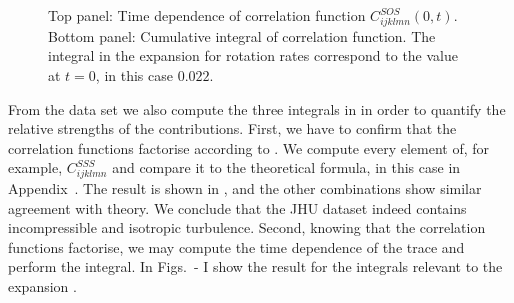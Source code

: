\documentclass[thesis.tex]{subfiles}
\begin{document}
\begin{figure}
	\begin{center}
\end{center}
\caption{ Top panel: Time dependence of correlation function $C^{SOS}_{ijklmn}(0,t)$. Bottom panel: Cumulative integral of correlation function. The integral in the expansion for rotation rates  correspond to the value at $t=0$, in this case $0.022$.}%
\end{figure}

From the data set we also compute the three integrals in  in order to quantify the relative strengths of the contributions. First, we have to confirm that the correlation functions factorise according to . We compute every element of, for example, $C^{SSS}_{ijklmn}$ and compare it to the theoretical formula, in this case  in Appendix~. The result is shown in , and the other combinations show similar agreement with theory. We conclude that the JHU dataset indeed contains incompressible and isotropic turbulence. Second, knowing that the correlation functions factorise, we may compute the time dependence of the trace and perform the integral. In Figs.~- I show the result for the integrals relevant to the expansion .
\end{document}

